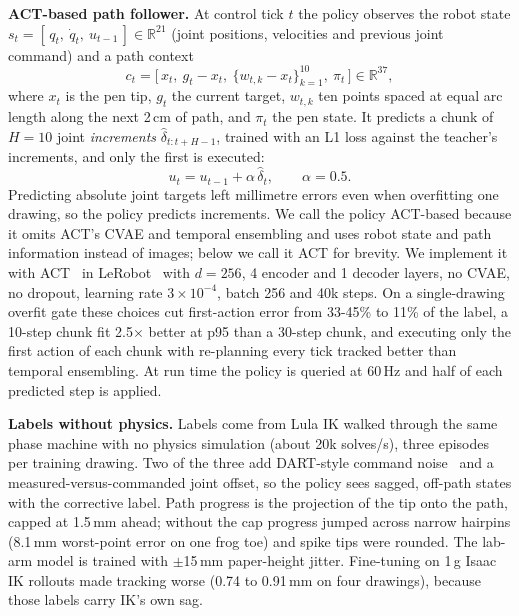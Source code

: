 \documentclass[conference]{IEEEtran}
\newcommand{\mm}{\,mm\xspace}
\begin{document}
\textbf{ACT-based path follower.} At control tick $t$ the policy observes the robot state
$s_t = [\,q_t,\ \dot q_t,\ u_{t-1}\,] \in \mathbb{R}^{21}$ (joint positions, velocities and previous joint
command) and a path context
\begin{equation}
  c_t = \big[\,x_t,\ g_t - x_t,\ \{w_{t,k} - x_t\}_{k=1}^{10},\ \pi_t\,\big] \in \mathbb{R}^{37},
\end{equation}
where $x_t$ is the pen tip, $g_t$ the current target, $w_{t,k}$ ten points spaced at equal arc length along the
next 2\,cm of path, and $\pi_t$ the pen state. It predicts a chunk of $H=10$ joint \emph{increments}
$\hat\delta_{t:t+H-1}$, trained with an L1 loss against the teacher's increments, and only the first is
executed:
\begin{equation}
  u_t = u_{t-1} + \alpha\, \hat\delta_t , \qquad \alpha = 0.5 .
  \label{eq:step}
\end{equation}
Predicting absolute joint targets left millimetre errors even when overfitting one drawing, so the policy
predicts increments. We call the policy ACT-based because it omits ACT's CVAE and temporal ensembling and uses
robot state and path information instead of images; below we call it ACT for brevity. We implement
it with ACT~\cite{zhao2023act} in LeRobot~\cite{lerobot2024} with $d=256$, 4
encoder and 1 decoder layers, no CVAE, no dropout, learning rate $3\times10^{-4}$, batch 256 and 40k steps. On a
single-drawing overfit gate these choices cut first-action error from 33-45\% to 11\% of the label, a 10-step
chunk fit 2.5$\times$ better at p95 than a 30-step chunk, and executing only the first action of each chunk
with re-planning every tick tracked better than temporal ensembling. At run time the policy is queried at
60\,Hz and half of each predicted step is applied.

\textbf{Labels without physics.} Labels come from Lula IK walked through the same phase machine with no
physics simulation (about 20k solves/s), three episodes per training drawing. Two of the three add DART-style
command noise~\cite{laskey2017dart} and a measured-versus-commanded joint offset, so the policy sees sagged,
off-path states with the corrective label. Path progress is the projection of the tip onto the path, capped
at 1.5\mm ahead; without the cap progress jumped across narrow hairpins (8.1\mm worst-point error on one
frog toe) and spike tips were rounded. The lab-arm model is trained with $\pm$15\mm paper-height jitter.
Fine-tuning on 1\,g Isaac IK rollouts made tracking worse (0.74 to 0.91\mm on four drawings), because those
labels carry IK's own sag.
\end{document}
